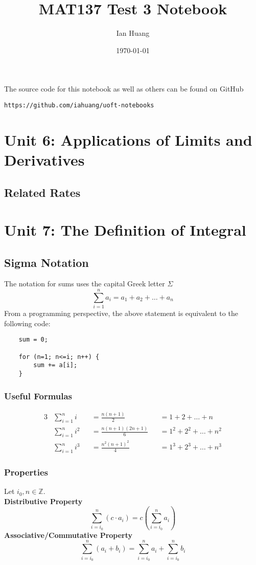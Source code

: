 \documentclass[10pt]{article}
\title{MAT137 Test 3 Notebook}
\author{Ian Huang}
\date{\today}
\def\Z{{\mathbb Z}}
\newcommand{\emptyline}[0]{\\\hfill$~$\\}
\begin{document}
\maketitle
\vfill

The source code for this notebook as well as others can be found on GitHub
\begin{center}
    \texttt{https://github.com/iahuang/uoft-notebooks}
\end{center}
\tableofcontents
\newpage
\section{Unit 6: Applications of Limits and Derivatives}
\subsection{Related Rates}

\section{Unit 7: The Definition of Integral}
\subsection{Sigma Notation}
The notation for sums uses the capital Greek letter $\Sigma$
$$
    \sum_{i=1}^n a_i=a_1+a_2+\dots+a_n
$$
From a programming perspective, the above statement is equivalent to the following code:
\begin{verbatim}
    sum = 0;
    
    for (n=1; n<=i; n++) {
        sum += a[i];
    }
\end{verbatim}
\subsubsection{Useful Formulas}

\begin{alignat*}{3}
     & \sum_{i=1}^n i   &  & =\frac{n(n+1)}{2}      &  & =1+2+\dots+n       \\
     & \sum_{i=1}^n i^2 &  & =\frac{n(n+1)(2n+1)}{6} &  & =1^2+2^2+\dots+n^2 \\
     & \sum_{i=1}^n i^3 &  & =\frac{n^2(n+1)^2}{4}  &  & =1^3+2^3+\dots+n^3
\end{alignat*}
\subsubsection{Properties}
Let $i_0,n\in\Z$. \emptyline
\textbf{Distributive Property}
$$
    \sum_{i=i_0}^n(c\cdot a_i)=c\left(\sum_{i=i_0}^n a_i\right)
$$
\textbf{Associative/Commutative Property}
$$
    \sum_{i=i_0}^n(a_i+b_i)=\sum_{i=i_0}^na_i+\sum_{i=i_0}^nb_i
$$
\end{document}
